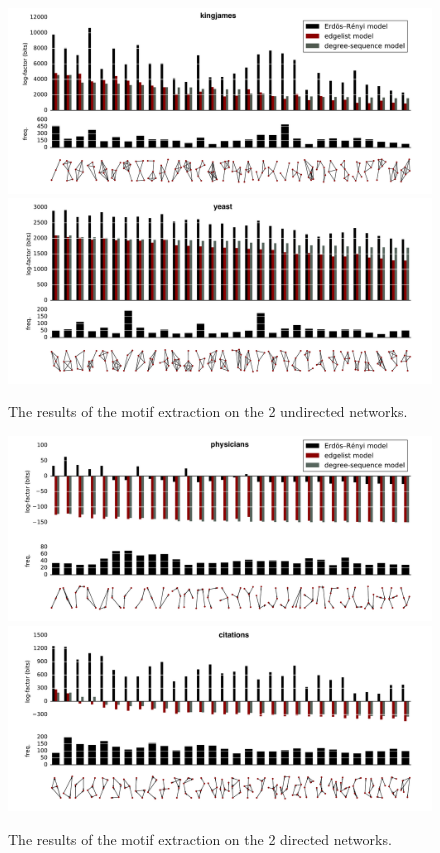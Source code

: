 \documentclass[twoside,11pt]{article}
\begin{document}
\begin{figure}[p]
  \includegraphics[width=\textwidth]{./images/kingjames/compare-plot.pdf}\\
  \includegraphics[width=\textwidth]{./images/yeast/compare-plot.pdf}\\
  \caption{The results of the motif extraction on the 2 undirected networks.}
  \label{figure:plot-und}
\end{figure}
  
\begin{figure}[p]
  \includegraphics[width=\textwidth]{./images/physicians/compare-plot.pdf}\\
  \includegraphics[width=\textwidth]{./images/citations/compare-plot.pdf}\\
  \caption{The results of the motif extraction on the 2 directed networks.}
  \label{figure:plot-dir}
\end{figure}
\end{document}
